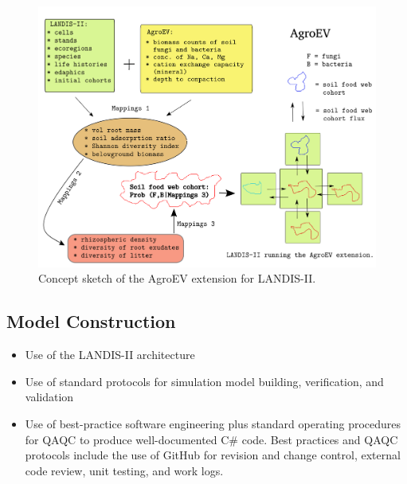 \begin{figure}
  \begin{center}
    \includegraphics[scale = 0.60]{Ch4_AgroEV/graphics/AgroEV_doc.png}
    \caption{Concept sketch of the AgroEV extension for LANDIS-II.}
    \label{fig:}
  \end{center}
\end{figure}


\subsection{Model Construction}
\begin{itemize}
  \item Use of the LANDIS-II architecture \citep{scheller_design_2007}
  \item Use of standard protocols for simulation model building, verification, and validation \citep{haefner_modeling_2005, law_simulation_2006}
  \item Use of best-practice software engineering plus standard operating procedures for QAQC to produce well-documented C\# code. Best practices and QAQC protocols include the use of GitHub for revision and change control, external code review, unit testing, and work logs.  
\end{itemize}

